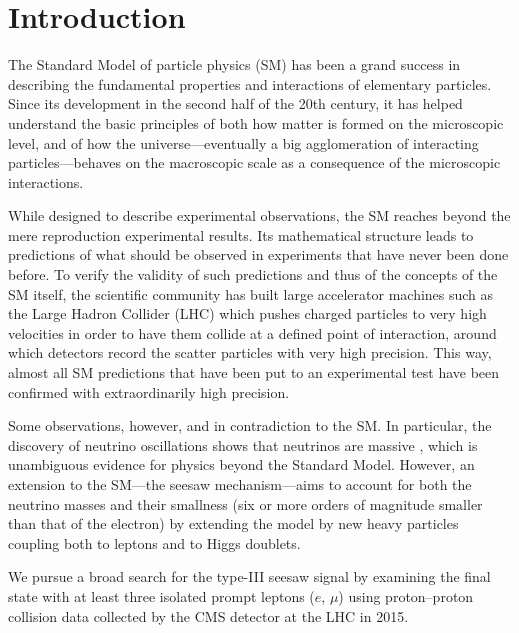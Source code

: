 \chapter{Introduction}
\label{sec:Introduction}

The Standard Model of particle physics (SM) \cite{i2003gauge,aitchison2003gauge,Peskin:257493} has been a grand success in describing the fundamental properties and interactions of elementary particles. Since its development in the second half of the 20th century, it has helped understand the basic principles of both how matter is formed on the microscopic level, and of how the universe\hairspace---\hairspace{}eventually a big agglomeration of interacting particles\hairspace---\hairspace{}behaves on the macroscopic scale as a consequence of the microscopic interactions.

While designed to describe experimental observations, the SM reaches beyond the mere reproduction experimental results. Its mathematical structure leads to predictions of what should be observed in experiments that have never been done before. To verify the validity of such predictions and thus of the concepts of the SM itself, the scientific community has built large accelerator machines such as the Large Hadron Collider (LHC) \cite{Evans:2008zzb} which pushes charged particles to very high velocities in order to have them collide at a defined point of interaction, around which detectors record the scatter particles with very high precision. This way, almost all SM predictions that have been put to an experimental test have been confirmed with extraordinarily high precision.

Some observations, however, and in contradiction to the SM. In particular, the discovery of neutrino oscillations shows that neutrinos are massive \cite{Nustatus}, which is unambiguous evidence for physics beyond the Standard Model. However, an extension to the SM\hairspace---\hairspace{}the seesaw mechanism\hairspace---\hairspace{}aims to account for both the neutrino masses and their smallness (six or more orders of magnitude smaller than that of the electron) by extending the model by new heavy particles coupling both to leptons and to Higgs doublets.

We pursue a broad search for the type-III seesaw signal \cite{SeesawIII:a} by examining the final state with at least three isolated prompt leptons ($e$, $\mu$) using proton--proton collision data collected by the CMS detector \cite{Chatrchyan:2008zzk} at the LHC in 2015.

